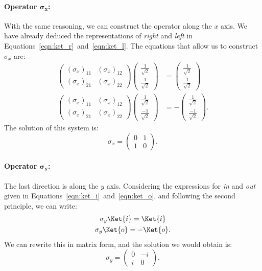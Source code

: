 \paragraph{Operator $\boldsymbol{\sigma_x}$:} With the same reasoning, we can construct the operator along the $x$ axis. We have already deduced the representations of \emph{right} and \emph{left} in Equations~\ref{eqn:ket_r}~and~\ref{eqn:ket_l}. The equations that allow us to construct $\sigma_x$ are:
\begin{align*}
	\begin{pmatrix}
		(\sigma_x)_{11} &(\sigma_x)_{12}\\
		(\sigma_x)_{21} &  (\sigma_x)_{22}
	\end{pmatrix} 
	\begin{pmatrix}
		\frac{1}{\sqrt{2}}\\
		\frac{1}{\sqrt{2}}
	\end{pmatrix} &= 
	\begin{pmatrix}
		\frac{1}{\sqrt{2}}\\
		\frac{1}{\sqrt{2}}
	\end{pmatrix} \\
	\begin{pmatrix}
		(\sigma_x)_{11} &  (\sigma_x)_{12}\\
		(\sigma_x)_{21} &  (\sigma_x)_{22}
	\end{pmatrix} 
	\begin{pmatrix}
		\frac{1}{\sqrt{2}}\\
		\frac{-1}{\sqrt{2}}
	\end{pmatrix} &= -
	\begin{pmatrix}
		\frac{1}{\sqrt{2}}\\
		\frac{-1}{\sqrt{2}}
	\end{pmatrix}.
\end{align*}
The solution of this system is:
\[
\sigma_x = 
\begin{pmatrix}
	0 & 1\\
	1 & 0
\end{pmatrix}.
\label{eqn:obs_x}
\]

\paragraph{Operator $\boldsymbol{\sigma_y}$:} The last direction is along the $y$ axis. Considering the expressions for \emph{in} and \emph{out} given in Equations~\ref{eqn:ket_i}~and~\ref{eqn:ket_o}, and following the second principle, we can write:
\begin{gather*}
	\sigma_y \Ket{i} = \Ket{i}\\
	\sigma_y \Ket{o} = -\Ket{o}.
\end{gather*}
We can rewrite this in matrix form, and the solution we would obtain is:
\[
\sigma_y = 
\begin{pmatrix}
	0 & -i\\
	i & 0
\end{pmatrix}.
\label{eqn:obs_y}
\]

